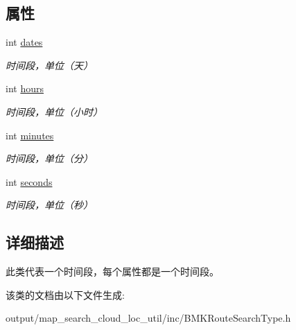 \subsection*{属性}
\begin{DoxyCompactItemize}
\item 
\hypertarget{interface_b_m_k_time_a24bb65125c9fd504229a04e616130cb1}{int \hyperlink{interface_b_m_k_time_a24bb65125c9fd504229a04e616130cb1}{dates}}\label{interface_b_m_k_time_a24bb65125c9fd504229a04e616130cb1}

\begin{DoxyCompactList}\small\item\em 时间段，单位（天） \end{DoxyCompactList}\item 
\hypertarget{interface_b_m_k_time_ae91ad4ffdcb6c8c42a5477199e4947f8}{int \hyperlink{interface_b_m_k_time_ae91ad4ffdcb6c8c42a5477199e4947f8}{hours}}\label{interface_b_m_k_time_ae91ad4ffdcb6c8c42a5477199e4947f8}

\begin{DoxyCompactList}\small\item\em 时间段，单位（小时） \end{DoxyCompactList}\item 
\hypertarget{interface_b_m_k_time_a8c39c525065b0fef0983a0feddae471d}{int \hyperlink{interface_b_m_k_time_a8c39c525065b0fef0983a0feddae471d}{minutes}}\label{interface_b_m_k_time_a8c39c525065b0fef0983a0feddae471d}

\begin{DoxyCompactList}\small\item\em 时间段，单位（分） \end{DoxyCompactList}\item 
\hypertarget{interface_b_m_k_time_a66d0a1c9418ef56ef10ad023513c0f95}{int \hyperlink{interface_b_m_k_time_a66d0a1c9418ef56ef10ad023513c0f95}{seconds}}\label{interface_b_m_k_time_a66d0a1c9418ef56ef10ad023513c0f95}

\begin{DoxyCompactList}\small\item\em 时间段，单位（秒） \end{DoxyCompactList}\end{DoxyCompactItemize}


\subsection{详细描述}
此类代表一个时间段，每个属性都是一个时间段。 

该类的文档由以下文件生成\+:\begin{DoxyCompactItemize}
\item 
output/map\+\_\+search\+\_\+cloud\+\_\+loc\+\_\+util/inc/B\+M\+K\+Route\+Search\+Type.\+h\end{DoxyCompactItemize}
